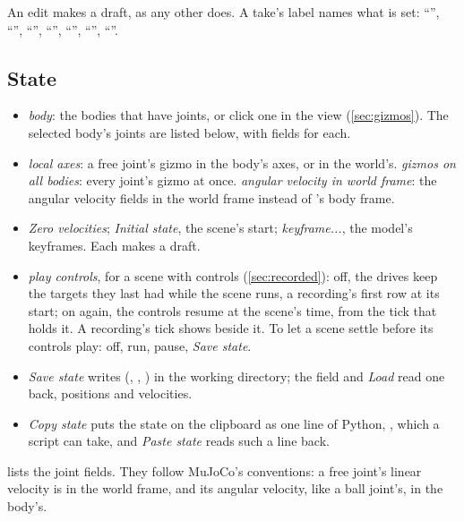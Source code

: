 An edit makes a draft, as any other does. A take's label names what is set: ``'', ``'', ``'', ``'', ``'', ``'', ``''.

\subsection{State}\label{sec:statepanel}

\begin{itemize}
\item \emph{body}: the bodies that have joints, or click one in the view (\cref{sec:gizmos}). The selected body's joints are listed below, with fields for each.
\item \emph{local axes}: a free joint's gizmo in the body's axes, or in the world's. \emph{gizmos on all bodies}: every joint's gizmo at once. \emph{angular velocity in world frame}: the angular velocity fields in the world frame instead of 's body frame.
\item \emph{Zero velocities}; \emph{Initial state}, the scene's start; \emph{keyframe...}, the model's keyframes. Each makes a draft.
\item \emph{play controls}, for a scene with controls (\cref{sec:recorded}): off, the drives keep the targets they last had while the scene runs, a recording's first row at its start; on again, the controls resume at the scene's time, from the tick that holds it. A recording's tick shows beside it. To let a scene settle before its controls play: off, run, pause, \emph{Save state}.
\item \emph{Save state} writes  (, , ) in the working directory; the field and \emph{Load} read one back, positions and velocities.
\item \emph{Copy state} puts the state on the clipboard as one line of Python, , which a script can take, and \emph{Paste state} reads such a line back.
\end{itemize}

 lists the joint fields. They follow MuJoCo's conventions: a free joint's linear velocity is in the world frame, and its angular velocity, like a ball joint's, in the body's.

